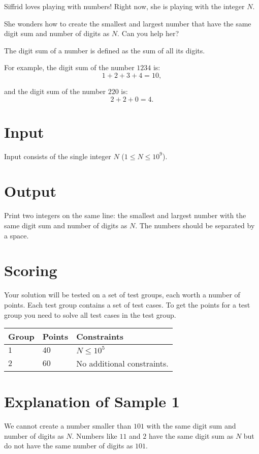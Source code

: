 
Siffrid loves playing with numbers! Right now, she is playing with the integer $N$.

She wonders how to create the smallest and largest number that have the same digit sum and number of digits as $N$.
Can you help her?

The digit sum of a number is defined as the sum of all its digits.

\noindent
For example, the digit sum of the number $1234$ is:
$$
1 + 2 + 3 + 4 = 10,  
$$

and the digit sum of the number $220$ is:
$$
2 + 2 + 0 = 4.
$$

\section*{Input}
Input consists of the single integer $N$ ($1 \le N \le 10^9$).

\section*{Output}
Print two integers on the same line: the smallest and largest number with the same digit sum and
number of digits as $N$. The numbers should be separated by a space.

\section*{Scoring}
Your solution will be tested on a set of test groups, each worth a number of points. Each test group contains
a set of test cases. To get the points for a test group you need to solve all test cases in the test group.

\noindent
\begin{tabular}{| l | l | p{12cm} |}
  \hline
  \textbf{Group} & \textbf{Points} & \textbf{Constraints} \\ \hline
  $1$    & $40$       & $N \leq 10^5$ \\ \hline
  $2$    & $60$       & No additional constraints. \\ \hline
\end{tabular}

\section*{Explanation of Sample 1}
We cannot create a number smaller than $101$ with the same digit sum and number of digits as $N$.
Numbers like $11$ and $2$ have the same digit sum as $N$ but do not have the same number of digits as $101$.
